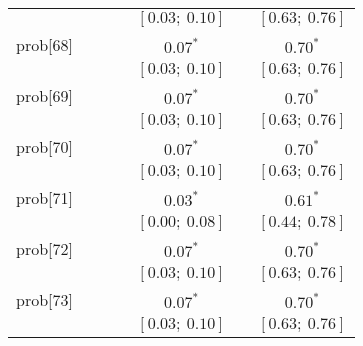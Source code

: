 \begin{table}
\begin{center}
\begin{tabular}{l c c c c c c }
          &                           &                           &                           & $[0.03;\ 0.10]$         &                           & $[0.63;\ 0.76]$       \\
prob[68]  &                           &                           &                           & $0.07^{*}$              &                           & $0.70^{*}$            \\
          &                           &                           &                           & $[0.03;\ 0.10]$         &                           & $[0.63;\ 0.76]$       \\
prob[69]  &                           &                           &                           & $0.07^{*}$              &                           & $0.70^{*}$            \\
          &                           &                           &                           & $[0.03;\ 0.10]$         &                           & $[0.63;\ 0.76]$       \\
prob[70]  &                           &                           &                           & $0.07^{*}$              &                           & $0.70^{*}$            \\
          &                           &                           &                           & $[0.03;\ 0.10]$         &                           & $[0.63;\ 0.76]$       \\
prob[71]  &                           &                           &                           & $0.03^{*}$              &                           & $0.61^{*}$            \\
          &                           &                           &                           & $[0.00;\ 0.08]$         &                           & $[0.44;\ 0.78]$       \\
prob[72]  &                           &                           &                           & $0.07^{*}$              &                           & $0.70^{*}$            \\
          &                           &                           &                           & $[0.03;\ 0.10]$         &                           & $[0.63;\ 0.76]$       \\
prob[73]  &                           &                           &                           & $0.07^{*}$              &                           & $0.70^{*}$            \\
          &                           &                           &                           & $[0.03;\ 0.10]$         &                           & $[0.63;\ 0.76]$       \\

\end{tabular}
\end{center}
\end{table}
